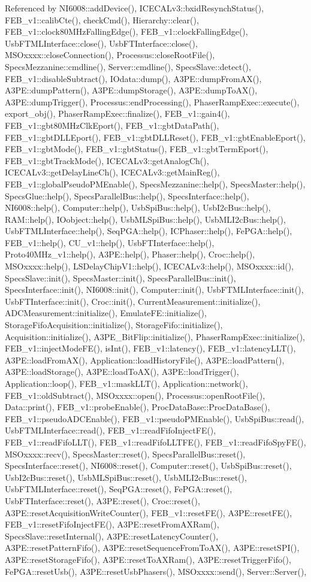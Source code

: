 Referenced by NI6008::addDevice(), ICECALv3::bxidResynchStatus(), FEB\_\-v1::calibCte(), checkCmd(), Hierarchy::clear(), FEB\_\-v1::clock80MHzFallingEdge(), FEB\_\-v1::clockFallingEdge(), UsbFTMLInterface::close(), UsbFTInterface::close(), MSOxxxx::closeConnection(), Processus::closeRootFile(), SpecsMezzanine::cmdline(), Server::cmdline(), SpecsSlave::detect(), FEB\_\-v1::disableSubtract(), IOdata::dump(), A3PE::dumpFromAX(), A3PE::dumpPattern(), A3PE::dumpStorage(), A3PE::dumpToAX(), A3PE::dumpTrigger(), Processus::endProcessing(), PhaserRampExec::execute(), export\_\-obj(), PhaserRampExec::finalize(), FEB\_\-v1::gain4(), FEB\_\-v1::gbt80MHzClkEport(), FEB\_\-v1::gbtDataPath(), FEB\_\-v1::gbtDLLEport(), FEB\_\-v1::gbtDLLReset(), FEB\_\-v1::gbtEnableEport(), FEB\_\-v1::gbtMode(), FEB\_\-v1::gbtStatus(), FEB\_\-v1::gbtTermEport(), FEB\_\-v1::gbtTrackMode(), ICECALv3::getAnalogCh(), ICECALv3::getDelayLineCh(), ICECALv3::getMainReg(), FEB\_\-v1::globalPseudoPMEnable(), SpecsMezzanine::help(), SpecsMaster::help(), SpecsGlue::help(), SpecsParallelBus::help(), SpecsInterface::help(), NI6008::help(), Computer::help(), UsbSpiBus::help(), UsbI2cBus::help(), RAM::help(), IOobject::help(), UsbMLSpiBus::help(), UsbMLI2cBus::help(), UsbFTMLInterface::help(), SeqPGA::help(), ICPhaser::help(), FePGA::help(), FEB\_\-v1::help(), CU\_\-v1::help(), UsbFTInterface::help(), Proto40MHz\_\-v1::help(), A3PE::help(), Phaser::help(), Croc::help(), MSOxxxx::help(), LSDelayChipV1::help(), ICECALv3::help(), MSOxxxx::id(), SpecsSlave::init(), SpecsMaster::init(), SpecsParallelBus::init(), SpecsInterface::init(), NI6008::init(), Computer::init(), UsbFTMLInterface::init(), UsbFTInterface::init(), Croc::init(), CurrentMeasurement::initialize(), ADCMeasurement::initialize(), EmulateFE::initialize(), StorageFifoAcquisition::initialize(), StorageFifo::initialize(), Acquisition::initialize(), A3PE\_\-BitFlip::initialize(), PhaserRampExec::initialize(), FEB\_\-v1::injectModeFE(), isInt(), FEB\_\-v1::latency(), FEB\_\-v1::latencyLLT(), A3PE::loadFromAX(), Application::loadHistoryFile(), A3PE::loadPattern(), A3PE::loadStorage(), A3PE::loadToAX(), A3PE::loadTrigger(), Application::loop(), FEB\_\-v1::maskLLT(), Application::network(), FEB\_\-v1::oldSubtract(), MSOxxxx::open(), Processus::openRootFile(), Data::print(), FEB\_\-v1::probeEnable(), ProcDataBase::ProcDataBase(), FEB\_\-v1::pseudoADCEnable(), FEB\_\-v1::pseudoPMEnable(), UsbSpiBus::read(), UsbFTMLInterface::read(), FEB\_\-v1::readFifoInjectFE(), FEB\_\-v1::readFifoLLT(), FEB\_\-v1::readFifoLLTFE(), FEB\_\-v1::readFifoSpyFE(), MSOxxxx::recv(), SpecsMaster::reset(), SpecsParallelBus::reset(), SpecsInterface::reset(), NI6008::reset(), Computer::reset(), UsbSpiBus::reset(), UsbI2cBus::reset(), UsbMLSpiBus::reset(), UsbMLI2cBus::reset(), UsbFTMLInterface::reset(), SeqPGA::reset(), FePGA::reset(), UsbFTInterface::reset(), A3PE::reset(), Croc::reset(), A3PE::resetAcquisitionWriteCounter(), FEB\_\-v1::resetFE(), A3PE::resetFE(), FEB\_\-v1::resetFifoInjectFE(), A3PE::resetFromAXRam(), SpecsSlave::resetInternal(), A3PE::resetLatencyCounter(), A3PE::resetPatternFifo(), A3PE::resetSequenceFromToAX(), A3PE::resetSPI(), A3PE::resetStorageFifo(), A3PE::resetToAXRam(), A3PE::resetTriggerFifo(), FePGA::resetUsb(), A3PE::resetUsbPhasers(), MSOxxxx::send(), Server::Server(), 